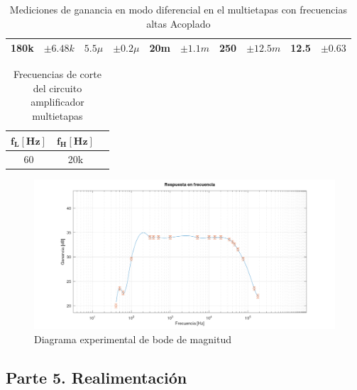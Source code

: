 \begin{enumerate}
\begin{table}[H]
\begin{tabular}{|c|c|c|c|c|c|c|c|c|c|}
            \hline
            180k           & $\pm 6.48k$              & $5.5 \mu$      & $\pm 0.2\mu$            & 20m            & $\pm 1.1m$              & 250            & $\pm 12.5m$             & 12.5             & $\pm 0.63$                \\
            \hline
          \end{tabular}
          \caption{Mediciones de ganancia en modo diferencial en el multietapas con frecuencias altas Acoplado}
          \label{tab:ganancia_frecuencias_altas}
        \end{table}




        \begin{table}[H]
          \centering
          \begin{tabular}{|c|c|c|}
            \hline
            $\mathbf{f_L[Hz]}$ & $\mathbf{f_H[Hz]}$ \\ \hline
            60                 & 20k                \\ \hline
          \end{tabular}
          \caption{Frecuencias de corte del circuito amplificador multietapas}
          \label{tab:frecuencias_corte}
        \end{table}

        \begin{figure}[H]
          \centering
          \setcounter{figure}{54}
          \includegraphics[width=\textwidth]{Imagenes/bode.png}
          \caption{Diagrama experimental de bode de magnitud}
          \label{fig:bode}
        \end{figure}
\end{enumerate}

\subsection{Parte 5. Realimentación} \label{subsec:parte5}


